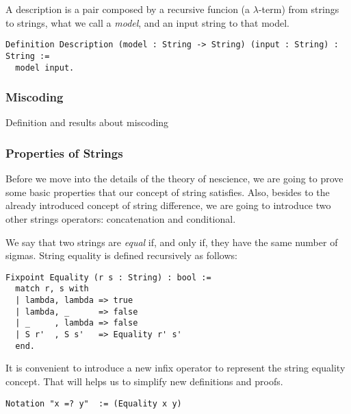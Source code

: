 A description is a pair composed by a recursive funcion (a $\lambda$-term) from strings to strings, what we call a \emph{model}, and an input string to that model.

\begin{sourcecode}
{\scriptsize \begin{verbatim}
Definition Description (model : String -> String) (input : String) : String :=
  model input.\end{verbatim}}
\end{sourcecode}


\subsubsection*{Miscoding}

{\color{red} Definition and results about miscoding}



\subsubsection*{Properties of Strings}

Before we move into the details of the theory of nescience, we are going to prove some basic properties that our concept of string satisfies. Also, besides to the already introduced concept of string difference, we are going to introduce two other strings operators: concatenation and conditional.

We say that two strings are \emph{equal} if, and only if, they have the same number of sigmas. String equality is defined recursively as follows:

\begin{sourcecode}
{\scriptsize \begin{verbatim}
Fixpoint Equality (r s : String) : bool :=
  match r, s with
  | lambda, lambda => true
  | lambda, _      => false
  | _     , lambda => false
  | S r'  , S s'   => Equality r' s'
  end.
\end{verbatim}}
\end{sourcecode}

It is convenient to introduce a new infix operator to represent the string equality concept. That will helps us to simplify new definitions and proofs.

\begin{sourcecode}
{\scriptsize \begin{verbatim}
Notation "x =? y"  := (Equality x y)
\end{verbatim}}
\end{sourcecode}

